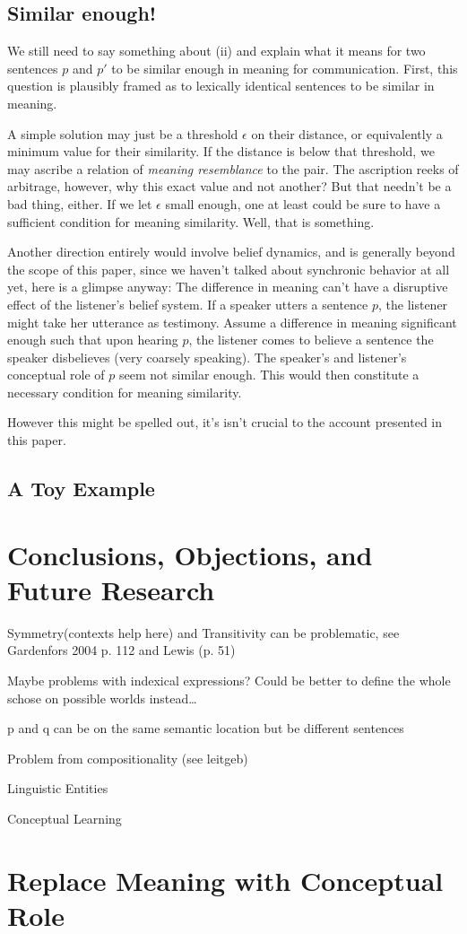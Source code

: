 \documentclass[11pt, a4paper]{scrartcl}
\renewcommand{\i}[1]{\emph{#1}}
\begin{document}
\subsection{Similar enough!}

We still need to say something about (ii) and explain what it means for two sentences $p$ and $p'$ to be similar enough in meaning for communication. First, this question is plausibly framed as to lexically identical sentences to be similar in meaning. 

A simple solution may just be a threshold $\epsilon$ on their distance, or equivalently a minimum value for their similarity. If the distance is below that threshold, we may ascribe a relation of \i{meaning resemblance} to the pair. The ascription reeks of arbitrage, however, why this exact value and not another? But that needn't be a bad thing, either. If we let $\epsilon$ small enough, one at least could be sure to have a sufficient condition for meaning similarity. Well, that is something. 

Another direction entirely would involve belief dynamics, and is generally beyond the scope of this paper, since we haven't talked about synchronic behavior at all yet, here is a glimpse anyway: The difference in meaning can't have a disruptive effect of the listener's belief system. If a speaker utters a sentence $p$, the listener might take her utterance as testimony. Assume a difference in meaning significant enough such that upon hearing $p$, the listener comes to believe a sentence the speaker disbelieves (very coarsely speaking). The speaker's and listener's conceptual role of $p$ seem not similar enough. This would then constitute a necessary condition for meaning similarity.

However this might be spelled out, it's isn't crucial to the account presented in this paper.

\subsection{A Toy Example}
\section{Conclusions, Objections, and Future Research}

Symmetry(contexts help here) and Transitivity can be problematic, see Gardenfors 2004 p. 112 and Lewis (p. 51)

Maybe problems with indexical expressions? Could be better to define the whole schose on possible worlds instead\ldots

p and q can be on the same semantic location but be different sentences

Problem from compositionality (see leitgeb)

Linguistic Entities

Conceptual Learning

\section{Replace Meaning with Conceptual Role}
\nocite{*}
\printbibliography{}
\end{document}
